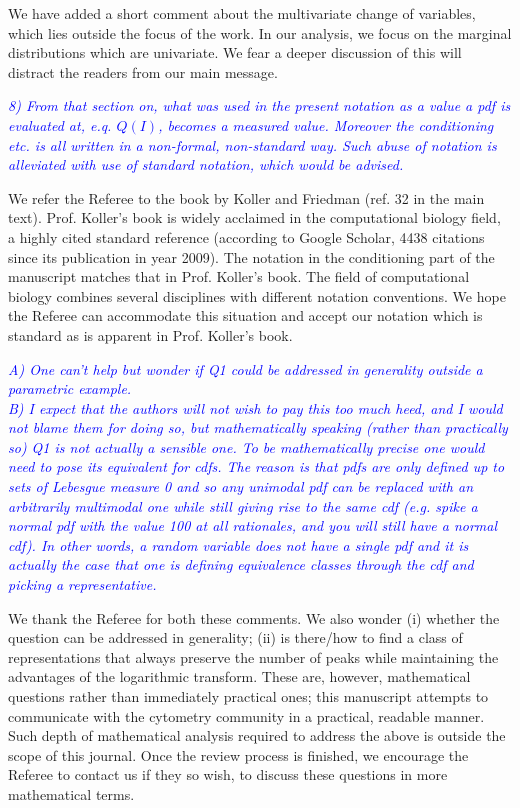 \documentclass[letter,11pt,draft]{article}
\newcommand{\re}[1]{\emph{\textcolor{blue}{#1}}}
\begin{document}
\smallskip
We have added a short comment about the multivariate change of variables, which lies outside the focus of the work. In our analysis, we focus on the marginal distributions which are univariate. We fear a deeper discussion of this will distract the readers from our main message. 

\re{
8) From that section on, what was used in the present notation as a value a pdf is evaluated at, e.q. $Q(I)$, becomes a measured value.  Moreover the conditioning etc. is all written in a non-formal, non-standard way. Such abuse of notation is alleviated with use of standard notation, which would be advised.}

\smallskip
We refer the Referee to the book by Koller and Friedman (ref. 32 in the main text). Prof. Koller's book is widely acclaimed in the computational biology field, a highly cited standard reference (according to Google Scholar, 4438 citations since its publication in year 2009). The notation in the conditioning part of the manuscript matches that in Prof. Koller's book. The field of computational biology combines several disciplines with different notation conventions. We hope the Referee can accommodate this situation and accept our notation which is standard as is apparent in Prof. Koller's book.

\re{
A) One can't help but wonder if Q1 could be addressed in generality outside a parametric example.
\\
B) I expect that the authors will not wish to pay this too much heed, and I would not blame them for doing so, but mathematically speaking (rather than practically so) Q1 is not actually a sensible one. To be mathematically precise one would need to pose its equivalent for cdfs. The reason is that pdfs are only defined up to sets of Lebesgue measure 0 and so any unimodal pdf can be replaced with an arbitrarily multimodal one while still giving rise to the same cdf (e.g. spike a normal pdf with the value 100 at all rationales, and you will still have a normal cdf). In other words, a random variable does not have a single pdf and it is actually the case that one is defining equivalence classes through the cdf and picking a representative.
}

\smallskip
We thank the Referee for both these comments. We also wonder (i) whether the question can be addressed in generality; (ii) is there/how to find a class of representations that always preserve the number of peaks while maintaining the advantages of the logarithmic transform. These are, however, mathematical questions rather than immediately practical ones; this manuscript attempts to communicate with the cytometry community in a practical, readable manner. Such depth of mathematical analysis required to address the above is outside the scope of this journal. Once the review process is finished, we encourage the Referee to contact us if they so wish, to discuss these questions in more mathematical terms.
\end{document}
